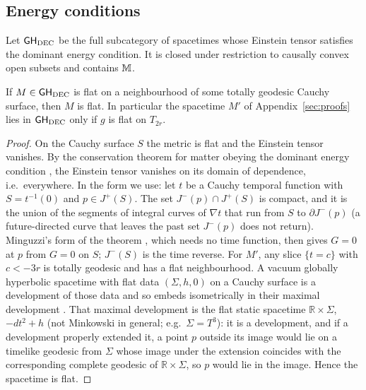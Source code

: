 \subsection{Energy conditions}\label{sec:energy}

Let $\mathsf{GH}_{\mathrm{DEC}}$ be the full subcategory of spacetimes whose Einstein
tensor satisfies the dominant energy condition. It is closed under restriction
to causally convex open subsets and contains $\mathbb M$.

\begin{proposition}\label{prop:dec}
If $M\in\mathsf{GH}_{\mathrm{DEC}}$ is flat on a neighbourhood of some totally geodesic
Cauchy surface, then $M$ is flat. In particular the spacetime $M'$ of Appendix~\ref{sec:proofs} lies in $\mathsf{GH}_{\mathrm{DEC}}$ only if
$g$ is flat on $T_{2r}$.
\end{proposition}

\begin{proof}
On the Cauchy surface $S$ the metric is flat and the Einstein tensor vanishes. By the conservation theorem
for matter obeying the dominant energy condition \citep[\S4.3]{HE1973}, the
Einstein tensor vanishes on its domain of dependence, i.e.\ everywhere. In the
form we use: let $t$ be a Cauchy temporal function with $S=t^{-1}(0)$
\citep[Thm.~1.2]{BS2006} and $p\in J^+(S)$. The set $J^-(p)\cap J^+(S)$ is compact, and
it is the union of the segments of integral curves of $\nabla t$ that run from
$S$ to $\partial J^-(p)$ (a future-directed curve that leaves the past set
$J^-(p)$ does not return). Minguzzi's form of the theorem \citep[Thm.~1]{Minguzzi2015},
which needs no time function, then gives $G=0$ at $p$ from $G=0$ on $S$;
$J^-(S)$ is the time reverse. For
$M'$, any slice $\{t=c\}$ with $c<-3r$ is totally geodesic and has a flat
neighbourhood.
A vacuum globally hyperbolic spacetime with flat data $(\Sigma,h,0)$ on a
Cauchy surface is a development of those data and so embeds isometrically in
their maximal development \citep[Thm.~3]{CBG1969}. That maximal development is
the flat static spacetime $\mathbb R\times\Sigma$, $-dt^2+h$ (not Minkowski in
general; e.g.\ $\Sigma=T^3$): it is a development, and if a development
properly extended it, a point $p$ outside its image would lie on a timelike
geodesic from $\Sigma$ whose image under the extension coincides with the
corresponding complete geodesic of $\mathbb R\times\Sigma$, so $p$ would lie in
the image. Hence the spacetime is flat.
\end{proof}

